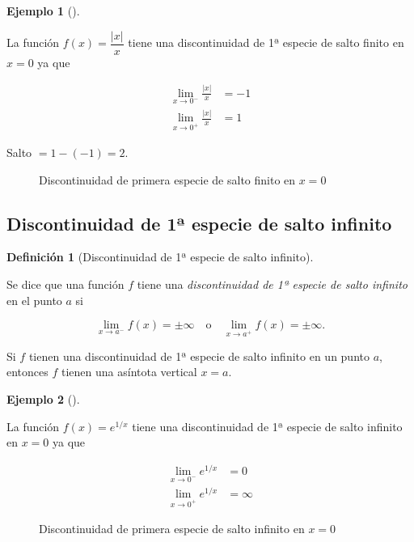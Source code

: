 \documentclass[
  a4paper,
]{scrreport}
\theoremstyle{definition}
\newtheorem{example}{Ejemplo}[chapter]
\theoremstyle{plain}
\theoremstyle{definition}
\newtheorem{definition}{Definición}[chapter]
\theoremstyle{definition}
\theoremstyle{plain}
\theoremstyle{plain}
\theoremstyle{remark}
\begin{document}
\begin{example}[]\protect\hypertarget{exm-discontinuidad-1-especie-salto-finito}{}\label{exm-discontinuidad-1-especie-salto-finito}

La función \(f(x)=\dfrac{\lvert x\rvert}{x}\) tiene una discontinuidad
de 1ª especie de salto finito en \(x=0\) ya que

\begin{align*}
\lim_{x\to 0^-}\frac{|x|}{x}&= -1\\
\lim_{x\to 0^+}\frac{|x|}{x}&= 1
\end{align*}

Salto \(= 1-(-1)=2\).

\begin{figure}
\centering

\caption{Discontinuidad de primera especie de salto finito en \(x=0\)}
\end{figure}

\end{example}

\subsection{Discontinuidad de 1ª especie de salto
infinito}\label{discontinuidad-de-1uxaa-especie-de-salto-infinito}

\begin{definition}[Discontinuidad de 1ª especie de salto
infinito]\protect\hypertarget{def-discontinuidad-1-especie-salto-infinito}{}\label{def-discontinuidad-1-especie-salto-infinito}

Se dice que una función \(f\) tiene una \emph{discontinuidad de 1ª
especie de salto infinito} en el punto \(a\) si

\[\lim_{x\to a^-}f(x)=\pm\infty \quad \mbox{o} \quad \lim_{x\to a^+}f(x)=\pm\infty.\]

\end{definition}

Si \(f\) tienen una discontinuidad de 1ª especie de salto infinito en un
punto \(a\), entonces \(f\) tienen una asíntota vertical \(x=a\).

\begin{example}[]\protect\hypertarget{exm-discontinuidad-1-especie-salto-infinito}{}\label{exm-discontinuidad-1-especie-salto-infinito}

La función \(f(x)=e^{1/x}\) tiene una discontinuidad de 1ª especie de
salto infinito en \(x=0\) ya que

\begin{align*}
\lim_{x\to 0^-}e^{1/x}&= 0\\
\lim_{x\to 0^+}e^{1/x}&= \infty
\end{align*}

\begin{figure}
\centering

\caption{Discontinuidad de primera especie de salto infinito en \(x=0\)}
\end{figure}

\end{example}
\end{document}
